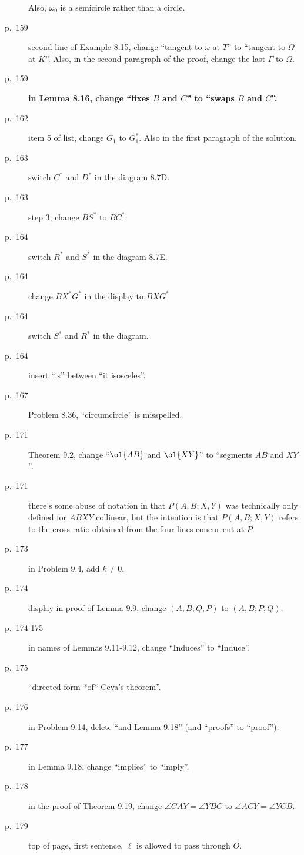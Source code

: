 \documentclass[11pt]{scrartcl}
\newcommand{\crucial}[1]{\textbf{\sffamily\large\color{red} #1}}
\begin{document}
\begin{description}
  Also, $\omega_0$ is a semicircle rather than a circle.
\item[p.\  159] second line of Example 8.15, change ``tangent to $\omega$ at $T$'' to ``tangent to $\Omega$ at $K$''.
  Also, in the second paragraph of the proof, change the last $\Gamma$ to $\Omega$.
\item[p.\  159] \crucial{in Lemma 8.16, change ``fixes $B$ and $C$'' to ``swaps $B$ and $C$''.}
\item[p.\  162] item 5 of list, change $G_1$ to $G_1^\ast$.
  Also in the first paragraph of the solution.
\item[p.\  163] switch $C^\ast$ and $D^\ast$ in the diagram 8.7D.
\item[p.\  163] step 3, change $BS^\ast$ to $BC^\ast$.
\item[p.\  164] switch $R^\ast$ and $S^\ast$ in the diagram 8.7E.
\item[p.\  164] change $BX^\ast G^\ast$ in the display to $BXG^\ast$
\item[p.\  164] switch $S^\ast$ and $R^\ast$ in the diagram.
\item[p.\  164] insert ``is'' between ``it isosceles''.
\item[p.\  167] Problem 8.36, ``circumcircle'' is misspelled.
\item[p.\  171] Theorem 9.2, change ``$\ol{AB}$ and $\ol{XY}$'' to ``segments $AB$ and $XY$''.
\item[p.\  171] there's some abuse of notation in that $P(A,B;X,Y)$ was technically only defined for $ABXY$ collinear, but the intention is that $P(A,B;X,Y)$ refers to the cross ratio obtained from the four lines concurrent at $P$.
\item[p.\  173] in Problem 9.4, add $k \neq 0$.
\item[p.\  174] display in proof of Lemma 9.9, change $(A,B;Q,P)$ to $(A,B;P,Q)$.
\item[p.\  174-175] in names of Lemmas 9.11-9.12,
  change ``Induces'' to ``Induce''.
\item[p.\  175] ``directed form *of* Ceva's theorem''.
\item[p.\  176] in Problem 9.14, delete ``and Lemma 9.18'' (and ``proofs'' to ``proof'').
\item[p.\  177] in Lemma 9.18, change ``implies'' to ``imply''.
\item[p.\  178] in the proof of Theorem 9.19, change $\angle CAY = \angle YBC$ to $\angle ACY = \angle YCB$.
\item[p.\  179] top of page, first sentence, $\ell$ is allowed to pass through $O$.

\end{description}
\end{document}
